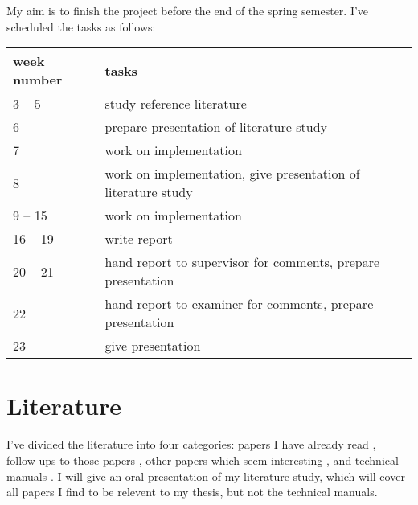 \documentclass[a4paper,11pt]{kth-mag}
\begin{document}
My aim is to finish the project before the end of the spring semester.
I've scheduled the tasks as follows:

\begin{table}[h]
\centering
\begin{tabular}{l|l}
week number & tasks \\
\hline
3 -- 5      & study reference literature \\
6           & prepare presentation of literature study \\
7           & work on implementation \\
8           & work on implementation, give presentation of literature study \\
9 -- 15     & work on implementation \\
16 -- 19    & write report \\
20 -- 21    & hand report to supervisor for comments, prepare presentation \\
22          & hand report to examiner for comments, prepare presentation \\
23          & give presentation \\
\end{tabular}
\end{table}

\section*{Literature}

I've divided the literature into four categories:
papers I have already read \cite{massalin87,granlund92,joshi02,bansal06},
follow-ups to those papers \cite{joshi03,joshi06,bansal_thesis},
other papers which seem interesting \cite{bansal08,brain06_iclp,brain06_nmr,crick09,crick_thesis,fraser88,gulwani10,knights09,tate09,tate10},
and technical manuals \cite{intel_2a,intel_2b}.
I will give an oral presentation of my literature study, which will cover all papers I find to be relevent to my thesis, but not the technical manuals.


\end{document}
